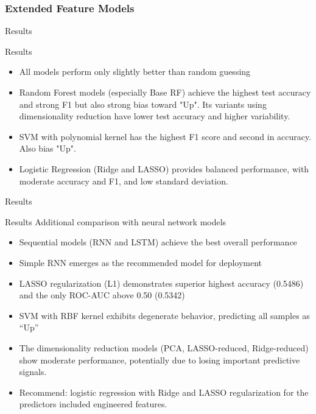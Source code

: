 \documentclass[aspectratio=43]{beamer} %
\begin{document}
\subsubsection{Extended Feature Models}
\begin{frame}{Results}
% 
\end{frame}



\begin{frame}{Results}
\begin{itemize}
  \item All models perform only slightly better than random guessing
  \item Random Forest models (especially Base RF) achieve the highest test accuracy and strong F1 but also strong bias toward "Up". Its variants using dimensionality reduction have lower test accuracy and higher variability.
  \item SVM with polynomial kernel has the highest F1 score and second in accuracy. Also bias "Up".
  \item Logistic Regression (Ridge and LASSO) provides balanced performance, with moderate accuracy and F1, and low standard deviation.
\end{itemize}
\end{frame}


\begin{frame}{Results}
% 
\end{frame}



\begin{frame}{Results}
  Additional comparison with neural network models 
\begin{itemize}
  \item Sequential models (RNN and LSTM) achieve the best overall performance 
  \item Simple RNN emerges as the recommended model for deployment
  \item LASSO regularization (L1) demonstrates superior highest accuracy (0.5486) and the only ROC-AUC above 0.50 (0.5342)
  \item  SVM with RBF kernel exhibits degenerate behavior, predicting all samples as ``Up'' 
  \item The dimensionality reduction models (PCA, LASSO-reduced, Ridge-reduced) show moderate performance, potentially due to losing important predictive signals. 
  \item Recommend: logistic regression with Ridge and LASSO regularization for the predictors included engineered features.
\end{itemize}
\end{frame}
\end{document}
